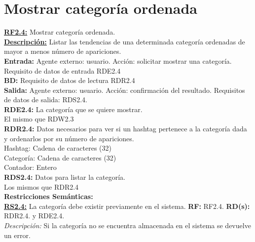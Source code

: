 \pagebreak

\section{Mostrar categoría ordenada}
\textbf{\textcolor{rojo}{\underline{RF2.4:}}} Mostrar categoría ordenada. \\[6pt]

\textbf{\textcolor{rojo}{\underline{Descripción:}}} Listar las tendencias de una determinada categoría ordenadas de mayor a menos número de apariciones.\\[6pt]

\textbf{\textcolor{rojo}{Entrada:}} Agente externo: usuario. Acción: solicitar mostrar una categoría. 
Requisito de datos de entrada \textcolor{azul}{RDE2.4} \\[6pt]

\textbf{\textcolor{rojo}{BD:}} Requisito de datos de lectura \textcolor{azul}{RDR2.4}\\[6pt]

\textbf{\textcolor{rojo}{Salida:}} Agente externo: usuario. Acción: confirmación del resultado.
Requisitos de datos de salida: \textcolor{azul}{RDS2.4}. \\[6pt] 

\textcolor{azul}{\textbf{RDE2.4:}} La categoría que se quiere mostrar. \\
\hspace*{1cm} El mismo que \textcolor{azul}{RDW2.3}\\

\textcolor{azul}{\textbf{RDR2.4:}} Datos necesarios para ver si un hashtag pertenece a la categoría dada y ordenarlos por su número de apariciones. \\
\hspace*{1cm} Hashtag: Cadena de caracteres (32)\\[12pt]
\hspace*{1cm} Categoría: Cadena de caracteres (32)\\[12pt]
\hspace*{1cm} Contador: Entero \\[12pt]

\textcolor{azul}{\textbf{RDS2.4:}} Datos para listar la categoría. \\
\hspace*{1cm} Los mismos que  \textcolor{azul}{RDR2.4}\\

\textbf{\textcolor{verde}{Restricciones Semánticas:}} \\[6pt]
\textbf{\textcolor{verde}{\underline{RS2.4:}}} La categoría debe existir previamente en el sistema. \textbf{RF:} RF2.4. \textbf{RD(s):} RDR2.4. y RDE2.4.\\
\hspace*{1cm} \textit{Descripción:} Si la categoría no se encuentra almacenada en el sistema se devuelve un error. \\[6pt]

